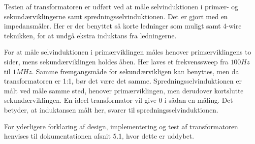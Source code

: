 \noindent Testen af transformatoren er udført ved at måle selvinduktionen i primær- og sekundærviklingerne samt spredningsselvinduktionen. Det er gjort med en impedansmåler. Her er der benyttet så korte ledninger som muligt samt 4-wire teknikken, for at undgå ekstra induktans fra ledningerne. 

For at måle selvinduktionen i primærviklingen måles henover primærviklingens to sider, mens sekundærviklingen holdes åben. Her laves et frekvenssweep fra $100Hz$ til $1MHz$. Samme fremgangsmåde for sekundærvikligen kan benyttes, men da transformatoren er 1:1, bør det være det samme.
Spredningsselvinduktionen er målt ved måle samme sted, henover primærviklingen, men derudover kortslutte sekundærviklingen. En ideel transformator vil give 0 i sådan en måling. Det betyder, at induktansen målt her, svarer til spredningsselvinduktionen. 

For yderligere forklaring af design, implementering og test af transformatoren henvises til dokumentationen afsnit 5.1, hvor dette er uddybet.